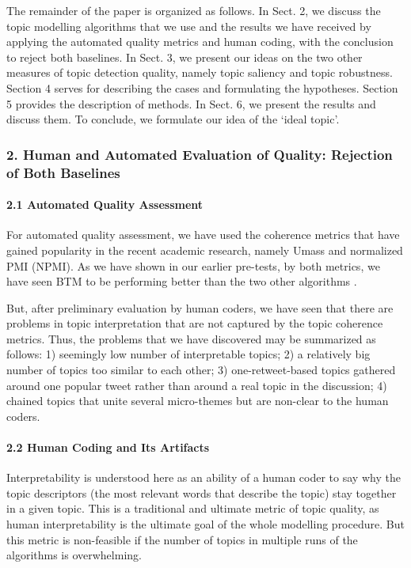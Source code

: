 The remainder of the paper is organized as follows. In Sect. 2, we discuss the topic modelling algorithms that we use and the results we have received by applying the automated quality metrics and human coding, with the conclusion to reject both baselines. In Sect. 3, we present our ideas on the two other measures of topic detection quality, namely topic saliency and topic robustness. Section 4 serves for describing the cases and formulating the hypotheses. Section 5 provides the description of methods. In Sect. 6, we present the results and discuss them. To conclude, we formulate our idea of the ‘ideal topic’.

\subsubsection{2. Human and Automated Evaluation of Quality: Rejection of Both Baselines}

\paragraph{2.1 Automated Quality Assessment}

For automated quality assessment, we have used the coherence metrics that have gained popularity in the recent academic research, namely Umass and normalized PMI (NPMI). As we have shown in our earlier pre-tests, by both metrics, we have seen BTM to be performing better than the two other algorithms \cite{BlekanovTarasovMaksimov}.

But, after preliminary evaluation by human coders, we have seen that there are problems in topic interpretation that are not captured by the topic coherence metrics. Thus, the problems that we have discovered may be summarized as follows: 1) seemingly low number of interpretable topics; 2) a relatively big number of topics too similar to each other; 3) one-retweet-based topics gathered around one popular tweet rather than around a real topic in the discussion; 4) chained topics that unite several micro-themes but are non-clear to the human coders.

\paragraph{2.2 Human Coding and Its Artifacts}

Interpretability is understood here as an ability of a human coder to say why the topic descriptors (the most relevant words that describe the topic) stay together in a given topic. This is a traditional and ultimate metric of topic quality, as human interpretability is the ultimate goal of the whole modelling procedure. But this metric is non-feasible if the number of topics in multiple runs of the algorithms is overwhelming.

